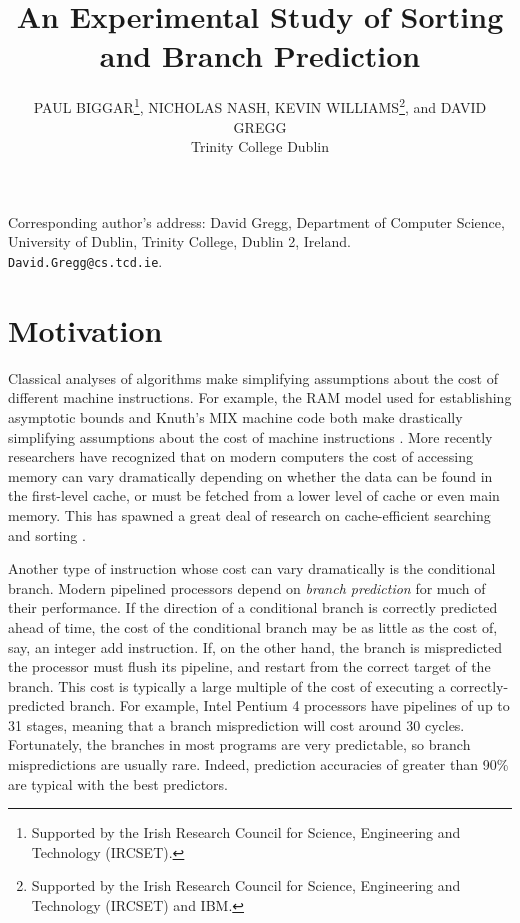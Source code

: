 \documentclass[acmtocl]{acmtrans2m}
\title{An Experimental Study of Sorting and Branch Prediction}
\author{
PAUL BIGGAR\footnote[1]{Supported by the Irish Research Council for Science,
Engineering and Technology (IRCSET).}, NICHOLAS NASH\footnotemark[1], KEVIN
WILLIAMS\footnote[2]{Supported by the Irish Research Council for Science,
Engineering and Technology (IRCSET) and IBM.}, and DAVID GREGG \\Trinity College
Dublin
}
\begin{document}
\begin{bottomstuff}
Corresponding author's address: David Gregg, Department of Computer
Science, University of Dublin, Trinity College, Dublin 2, Ireland. {\tt
David.Gregg@cs.tcd.ie}.
\end{bottomstuff}

\maketitle

\section{Motivation}
Classical analyses of algorithms make simplifying assumptions about the cost of
different machine instructions. For example, the RAM model used for establishing
asymptotic bounds and Knuth's MIX machine code both make drastically simplifying
assumptions about the cost of machine instructions \cite{KnuthVol1_97}. More
recently researchers have recognized that on modern computers the cost of
accessing memory can vary dramatically depending on whether the data can be
found in the first-level cache, or must be fetched from a lower level of cache
or even main memory.  This has spawned a great deal of research on
cache-efficient searching and sorting
\cite{Nyberg+94,Agarwal96,LaMarca96b,LaMarca96a,LaMarca97,Xiao+00,Rahman+01,Wickremesinghe+02}.

Another type of instruction whose cost can vary dramatically is the conditional
branch. Modern pipelined processors depend on \emph{branch prediction} for much
of their performance.  If the direction of a conditional branch is correctly
predicted ahead of time, the cost of the conditional branch may be as little as
the cost of, say, an integer add instruction. If, on the other hand, the branch
is mispredicted the processor must flush its pipeline, and restart from the
correct target of the branch. This cost is typically a large multiple of the
cost of executing a correctly-predicted branch. For example, Intel Pentium 4
processors \cite{Intel248966-010,Intel249438-01} have pipelines of up to 31
stages, meaning that a branch misprediction will cost around 30 cycles.
Fortunately, the branches in most programs are very predictable, so branch
mispredictions are usually rare. Indeed, prediction accuracies of greater than
90\% are typical \cite{Uht+97} with the best predictors.
\end{document}
